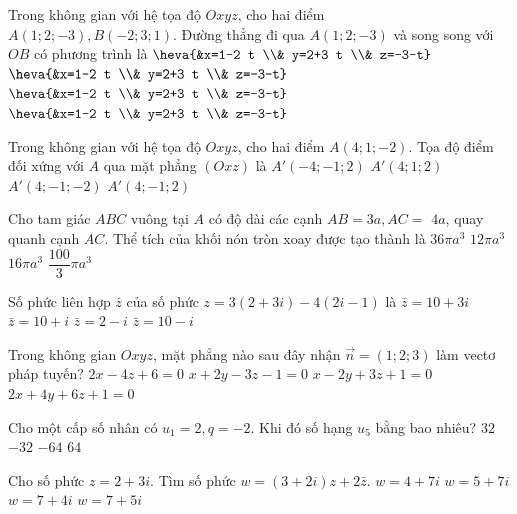 \begin{ex}%
Trong không gian với hệ tọa độ $O x y z$, cho hai điểm\\ $A(1; 2;-3), B(-2; 3; 1)$. Đường thẳng đi qua $A(1; 2;-3)$ và song song với $OB$ có phương trình là
\choice
{$\heva{&x=1-2 t \\& y=2+3 t \\& z=-3-t}$}
{$\heva{&x=1-2 t \\& y=2+3 t \\& z=-3-t}$}
{\True $\heva{&x=1-2 t \\& y=2+3 t \\& z=-3-t}$}
{$\heva{&x=1-2 t \\& y=2+3 t \\& z=-3-t}$}

\end{ex}
\begin{ex}%
Trong không gian với hệ tọa độ $O x y z$, cho hai điểm $A(4; 1;-2)$.
Tọa độ điểm đối xứng với $A$ qua mặt phẳng $(O x z)$ là
\choice
{$A'(-4;-1; 2)$}
{$A'(4; 1; 2)$}
{\True $A'(4;-1;-2)$}
{$A'(4;-1; 2)$}

\end{ex}
\begin{ex}%
Cho tam giác $ABC$ vuông tại $A$ có độ dài các cạnh $AB=3 a, AC=$ $4 a$, quay quanh cạnh $AC$. Thể tích của khối nón tròn xoay được tạo thành là
\choice
{$36\pi a^3$}
{$12\pi a^3$}
{\True $16\pi a^3$}
{$\dfrac{100}{3} \pi a^3$}

\end{ex}
\begin{ex}%
Số phức liên hợp $\bar{z}$ của số phức $z=3(2+3 i)-4(2 i-1)$ là
\choice
{$\bar{z}=10+3 i$}
{$\bar{z}=10+i$}
{$\bar{z}=2-i$}
{\True $\bar{z}=10-i$}

\end{ex}
\begin{ex}%
Trong không gian $O x y z$, mặt phẳng nào sau đây nhận $\vec{n}=(1; 2; 3)$ làm vectơ pháp tuyến?
\choice
{$2 x-4 z+6=0$}
{$x+2 y-3 z-1=0$}
{$x-2 y+3 z+1=0$}
{\True $2 x+4 y+6 z+1=0$}

\end{ex}
\begin{ex}%
Cho một cấp số nhân có $u_1=2, q=-2$. Khi đó số hạng $u_5$ bằng bao nhiêu?
\choice
{\True $32$}
{$-32$}
{$-64$}
{$64$}

\end{ex}
\begin{ex}%
Cho số phức $z=2+3 i$. Tìm số phức $w=(3+2 i) z+2\bar{z}$.
\choice
{\True $w=4+7 i$}
{$w=5+7 i$}
{$w=7+4 i$}
{$w=7+5 i$}

\end{ex}
